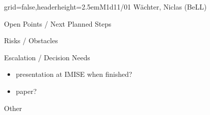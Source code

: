 \documentclass[english]{kiesgrube}
\begin{document}
\begin{poster}{grid=false,headerheight=2.5em}{}{M1d11/01 Wächter, Niclas (BeLL)}{}{}
\begin{posterbox}[name=open,column=1,below=description]{Open Points / Next Planned Steps}
\end{posterbox}
\begin{posterbox}[name=risks,column=1,below=open]{Risks / Obstacles}
\end{posterbox}
\begin{posterbox}[name=escalation,column=1,below=risks]{Escalation / Decision Needs}
\begin{itemize}
\item presentation at IMISE when finished?
\item paper?
\end{itemize}
\end{posterbox}
\begin{posterbox}[name=other,column=1,below=escalation]{Other}
\end{posterbox}
\footer{}
\end{poster}

\newpage
\end{document}
